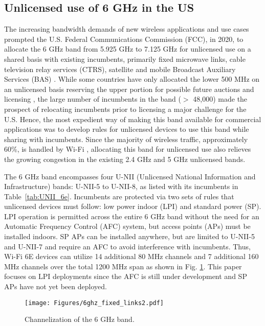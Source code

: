 \documentclass[sigconf,10pt]{acmart}
\begin{document}
\subsection{Unlicensed use of 6 GHz in the US}

The increasing bandwidth demands of new wireless applications and use cases prompted the U.S. Federal Communications Commission (FCC), in 2020, to allocate the 6 GHz band from 5.925 GHz to 7.125 GHz for unlicensed use on a shared basis with existing incumbents, primarily fixed microwave links, cable television relay services (CTRS), satellite and mobile Broadcast Auxiliary Services (BAS) \cite{FCC1}. While some countries have only allocated the lower 500 MHz on an unlicensed basis reserving the upper portion for possible future auctions and licensing \cite{WiFi2}, the large number of incumbents in the band ($>$ 48,000) made the prospect of relocating incumbents prior to licensing a major challenge for the U.S. Hence, the most expedient way of making this band available for commercial applications was to develop rules for unlicensed devices to use this band while sharing with incumbents.
Since the majority of wireless traffic, approximately 60\%, is handled by Wi-Fi \cite{9762843}, 
allocating this band for unlicensed use also relieves the growing congestion in the existing 2.4 GHz and 5 GHz unlicensed bands. 

The 6 GHz band encompasses four U-NII (Unlicensed National Information and Infrastructure) bands: U-NII-5 to U-NII-8, as listed with its incumbents in Table~\ref{tab:UNII_6e}. 
Incumbents are protected via two sets of rules that unlicensed devices must follow: low power indoor (LPI) and standard power (SP).
LPI operation is permitted across the entire 6 GHz band without the need for an Automatic Frequency Control (AFC) system, but access points (APs) must be installed indoors. SP APs can be installed anywhere, but are limited to U-NII-5 and U-NII-7 and require an AFC to avoid interference with incumbents. 
Thus, Wi-Fi 6E devices can utilize 14 additional 80 MHz channels and 7 additional 160 MHz channels over the total 1200 MHz span 
as shown in Fig. \ref{Fig:6ghz_freq_chart}. This paper focuses on LPI deployments since the AFC is still under development and SP APs have not yet been deployed.

\begin{figure}
    \centering
    \texttt{[image: Figures/6ghz\_fixed\_links2.pdf]}
    \vspace{-2em}
    \caption{Channelization of the 6 GHz band.}
    \label{Fig:6ghz_freq_chart}
    \vspace{-1.5em}
\end{figure}
\end{document}
